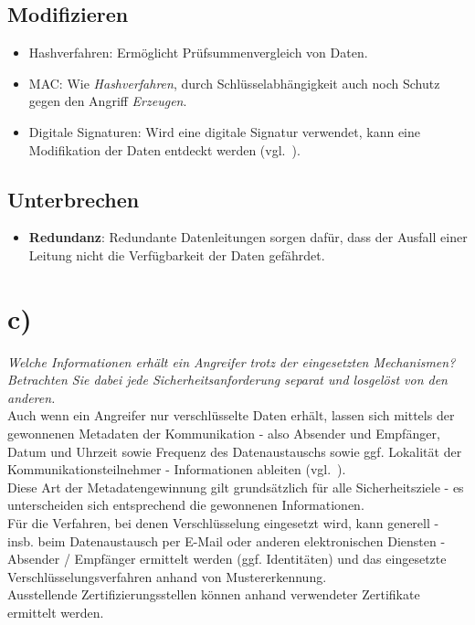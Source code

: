 \subsection*{Modifizieren}
\begin{itemize}
    \itemsep0.5em
    \item {Hashverfahren}: Ermöglicht Prüfsummenvergleich von Daten.
    \item {MAC}: Wie \textit{Hashverfahren}, durch Schlüsselabhängigkeit auch noch Schutz gegen den Angriff \textit{Erzeugen}.
    \item {Digitale Signaturen}: Wird eine digitale Signatur verwendet, kann eine Modifikation der Daten entdeckt werden (vgl.~\cite[382]{Eck18}).
\end{itemize}

\subsection*{Unterbrechen}
\begin{itemize}
    \itemsep0.5em
    \item \textbf{Redundanz}: Redundante Datenleitungen sorgen dafür, dass der Ausfall einer Leitung nicht die Verfügbarkeit der Daten gefährdet.
\end{itemize}

\section{c)}

\textit{Welche Informationen erhält ein Angreifer trotz der eingesetzten Mechanismen?
Betrachten Sie dabei jede Sicherheitsanforderung separat und losgelöst von den
anderen.}\\

\noindent
Auch wenn ein Angreifer nur verschlüsselte Daten erhält, lassen sich mittels der gewonnenen Metadaten der Kommunikation - also Absender und Empfänger, Datum und Uhrzeit sowie Frequenz des Datenaustauschs sowie ggf. Lokalität der Kommunikationsteilnehmer - Informationen ableiten (vgl.~\cite[25 f.]{Sch15b}).\\
Diese Art der Metadatengewinnung gilt grundsätzlich für alle Sicherheitsziele - es unterscheiden sich entsprechend die gewonnenen Informationen.\\
Für die Verfahren, bei denen Verschlüsselung eingesetzt wird, kann generell - insb. beim Datenaustausch per E-Mail oder anderen elektronischen Diensten - Absender / Empfänger ermittelt werden (ggf. Identitäten) und das eingesetzte Verschlüsselungsverfahren anhand von Mustererkennung.\\
Ausstellende Zertifizierungsstellen können anhand verwendeter Zertifikate ermittelt werden.

